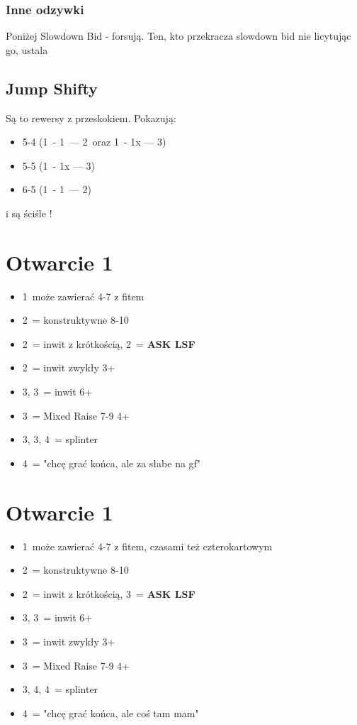 \documentclass[12pt, a4paper]{article}
\newcommand{\lsf}{\color{WildStrawberry}\textbf{ASK LSF}\color{black}}
\begin{document}
\subsubsection*{Inne odzywki}
Poniżej Slowdown Bid - forsują. Ten, kto przekracza slowdown bid nie licytując go, ustala \gf

\subsection*{Jump Shifty}
Są to rewersy z przeskokiem. Pokazują:
\begin{itemize}
    \item 5-4 (1\minor\ - 1\hearts\ --- 2\spades\ oraz 1\diams\ - 1x --- 3\clubs)
    \item 5-5 (1\major\ - 1x --- 3\minor)
    \item 6-5 (1\hearts\ - 1\nt\ --- 2\spades)
\end{itemize} 
i są ściśle \gf!



\pagebreak
\section{Otwarcie 1\hearts}
\begin{itemize}
    \item 1\nt\ może zawierać 4-7 z fitem
    \item 2\hearts\ = konstruktywne 8-10
    \item 2\spades\ = inwit z krótkością, 2\nt\ = \lsf
    \item 2\nt\ = inwit zwykły 3+\hearts
    \item 3\clubs, 3\diams\ = inwit 6+\minor
    \item 3\hearts\ = Mixed Raise 7-9 4+\hearts
    \item 3\spades, 3\nt, 4\clubs\ = splinter
    \item 4\diams\ = "chcę grać końca, ale za słabe na gf"
\end{itemize}

\section{Otwarcie 1\spades}
\begin{itemize}
    \item 1\nt\ może zawierać 4-7 z fitem, czasami też czterokartowym
    \item 2\spades\ = konstruktywne 8-10
    \item 2\nt\ = inwit z krótkością, 3\clubs\ = \lsf
    \item 3\clubs, 3\diams\ = inwit 6+\minor
    \item 3\hearts\ = inwit zwykły 3+\spades
    \item 3\spades\ = Mixed Raise 7-9 4+\spades
    \item 3\nt, 4\clubs, 4\diams\ = splinter
    \item 4\hearts\ = "chcę grać końca, ale coś tam mam"
\end{itemize}
\end{document}
